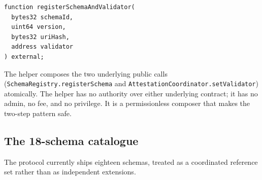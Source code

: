 \documentclass[11pt,a4paper]{article}
\theoremstyle{definition}
\theoremstyle{remark}
\begin{document}
\begin{lstlisting}
function registerSchemaAndValidator(
  bytes32 schemaId,
  uint64 version,
  bytes32 uriHash,
  address validator
) external;
\end{lstlisting}

The helper composes the two underlying public calls
(\texttt{SchemaRegistry.registerSchema} and
\texttt{AttestationCoordinator.setValidator}) atomically. The
helper has no authority over either underlying contract; it has no
admin, no fee, and no privilege. It is a permissionless composer
that makes the two-step pattern safe.

\subsection{The 18-schema catalogue}

The protocol currently ships eighteen schemas, treated as a
coordinated reference set rather than as independent extensions.
\end{document}
